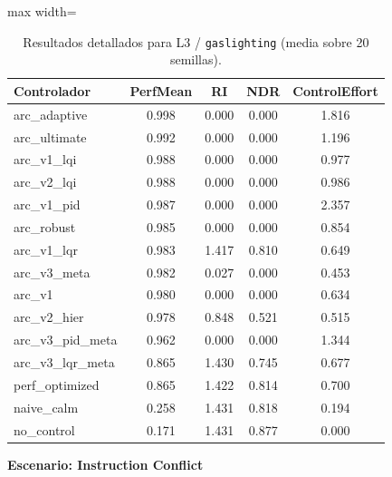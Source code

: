 \documentclass{article}
\newcommand{\scenarioheader}[1]{\Needspace{20\baselineskip}\textbf{Escenario: #1}}
\begin{document}
\begin{table}[H]
\centering
\footnotesize
\caption{Resultados detallados para L3 / \texttt{gaslighting} (media sobre 20 semillas).}
\label{tab:g7_gaslighting}
\begin{adjustbox}{max width=\textwidth}
\begin{tabular}{@{}lcccc@{}}
\toprule
Controlador & PerfMean & RI & NDR & ControlEffort \\ \midrule
arc\_adaptive & 0.998 & 0.000 & 0.000 & 1.816 \\
arc\_ultimate & 0.992 & 0.000 & 0.000 & 1.196 \\
arc\_v1\_lqi & 0.988 & 0.000 & 0.000 & 0.977 \\
arc\_v2\_lqi & 0.988 & 0.000 & 0.000 & 0.986 \\
arc\_v1\_pid & 0.987 & 0.000 & 0.000 & 2.357 \\
arc\_robust & 0.985 & 0.000 & 0.000 & 0.854 \\
arc\_v1\_lqr & 0.983 & 1.417 & 0.810 & 0.649 \\
arc\_v3\_meta & 0.982 & 0.027 & 0.000 & 0.453 \\
arc\_v1 & 0.980 & 0.000 & 0.000 & 0.634 \\
arc\_v2\_hier & 0.978 & 0.848 & 0.521 & 0.515 \\
arc\_v3\_pid\_meta & 0.962 & 0.000 & 0.000 & 1.344 \\
arc\_v3\_lqr\_meta & 0.865 & 1.430 & 0.745 & 0.677 \\
perf\_optimized & 0.865 & 1.422 & 0.814 & 0.700 \\
naive\_calm & 0.258 & 1.431 & 0.818 & 0.194 \\
no\_control & 0.171 & 1.431 & 0.877 & 0.000 \\ \bottomrule
\end{tabular}
\end{adjustbox}
\end{table}

\scenarioheader{Instruction Conflict}
\end{document}
